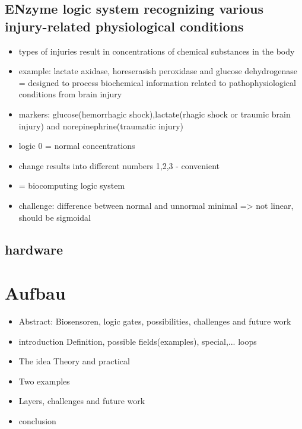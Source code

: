 \documentclass[12pt]{article}
\begin{document}
\subsection{ENzyme logic system recognizing various injury-related physiological conditions}
\begin{itemize}
	\item types of injuries result in concentrations of chemical substances in the body
	\item example: lactate axidase, horeserasish peroxidase and glucose dehydrogenase = designed to process biochemical information related to pathophysiological conditions from brain injury
	\item markers: glucose(hemorrhagic shock),lactate(rhagic shock or traumic brain injury) and norepinephrine(traumatic injury)
	\item logic 0 = normal concentrations
	\item change results into different numbers 1,2,3 - convenient
	\item = biocomputing logic system 
	\item challenge: difference between normal and unnormal minimal => not linear, should be sigmoidal
	
\end{itemize}

\subsection{hardware}

\section{Aufbau}
\begin{itemize}
	\item Abstract:
	Biosensoren, logic gates, possibilities, challenges and future work
	\item introduction
	Definition, possible fields(examples), special,... loops
	\item The idea 
	Theory and practical
	\item Two examples 
	\item Layers, challenges and future work
	\item conclusion
\end{itemize}
	
\end{document}
